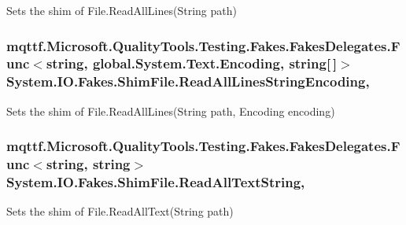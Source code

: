 Sets the shim of File.\-Read\-All\-Lines(\-String path)

\hypertarget{class_system_1_1_i_o_1_1_fakes_1_1_shim_file_af3da5f0b25b0166e65fd1f2d7116aa7c}{
\subsubsection[{Read\-All\-Lines\-String\-Encoding}]{\setlength{\rightskip}{0pt plus 5cm}mqttf.\-Microsoft.\-Quality\-Tools.\-Testing.\-Fakes.\-Fakes\-Delegates.\-Func$<$string, global.\-System.\-Text.\-Encoding, string\mbox{[}$\,$\mbox{]}$>$ System.\-I\-O.\-Fakes.\-Shim\-File.\-Read\-All\-Lines\-String\-Encoding\hspace{0.3cm}{\ttfamily [static]}, {\ttfamily [set]}}}\label{class_system_1_1_i_o_1_1_fakes_1_1_shim_file_af3da5f0b25b0166e65fd1f2d7116aa7c}


Sets the shim of File.\-Read\-All\-Lines(\-String path, Encoding encoding)

\hypertarget{class_system_1_1_i_o_1_1_fakes_1_1_shim_file_a82fb6941beeb31a982ee4f595ba3f003}{
\subsubsection[{Read\-All\-Text\-String}]{\setlength{\rightskip}{0pt plus 5cm}mqttf.\-Microsoft.\-Quality\-Tools.\-Testing.\-Fakes.\-Fakes\-Delegates.\-Func$<$string, string$>$ System.\-I\-O.\-Fakes.\-Shim\-File.\-Read\-All\-Text\-String\hspace{0.3cm}{\ttfamily [static]}, {\ttfamily [set]}}}\label{class_system_1_1_i_o_1_1_fakes_1_1_shim_file_a82fb6941beeb31a982ee4f595ba3f003}


Sets the shim of File.\-Read\-All\-Text(\-String path)

